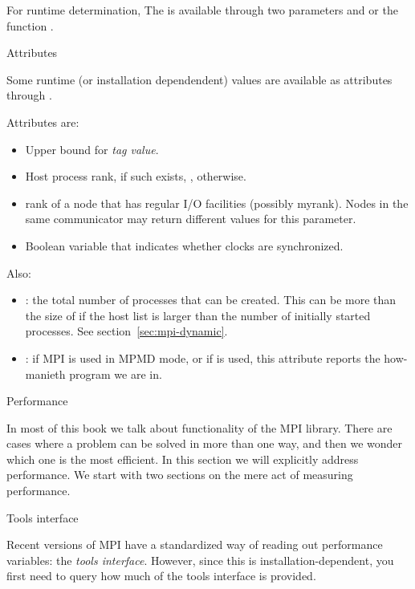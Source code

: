 For runtime determination,
The  is available through two parameters
 and 
or the function .

 {Attributes}
\label{sec:mpi_attr}

Some runtime (or installation dependendent) values are available as
attributes through
.

Attributes are:
\begin{itemize}
\item {}
  Upper bound for \emph{tag value}.
\item {}
  Host process rank, if such exists, , otherwise.
\item {}
rank of a node that has regular I/O facilities (possibly
myrank). Nodes in the same communicator may return different values
for this parameter.
\item {}
Boolean variable that indicates whether clocks are synchronized.
\end{itemize}

Also:
\begin{itemize}
\item {}: the total number of processes
  that can be created. This can be more than the size of
   if the host list is larger than the number of
  initially started processes. See section~\ref{sec:mpi-dynamic}.
\item {}: if MPI is used in \ac{MPMD} mode, or
  if  is used, this attribute
  reports the how-manieth program we are in.
\end{itemize}

 {Performance}
\label{sec:mpi-performance}

In most of this book we talk about functionality of the MPI
library. There are cases where a problem can be solved in more than
one way, and then we wonder which one is the most efficient. In this
section we will explicitly address performance. We start with two
sections on the mere act of measuring performance.

 {Tools interface}

Recent versions of MPI have a standardized way of reading out
performance variables: the \emph{tools interface}.
However, since this is installation-dependent,
you first need to query how much of the tools interface is provided.


